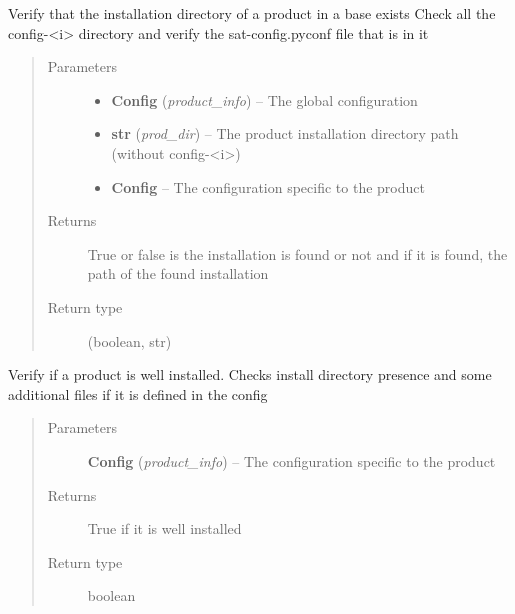 \documentclass[a4paper,10pt,english]{sphinxmanual}
\begin{document}
\begin{fulllineitems}
\label{commands/apidoc/src:src.product.check_config_exists}
Verify that the installation directory of a product in a base exists
Check all the config-\textless{}i\textgreater{} directory and verify the sat-config.pyconf file
that is in it
\begin{quote}\begin{description}
\item[{Parameters}] \leavevmode\begin{itemize}
\item {} 
\textbf{Config} (\emph{product\_info}) -- The global configuration

\item {} 
\textbf{str} (\emph{prod\_dir}) -- The product installation directory path 
(without config-\textless{}i\textgreater{})

\item {} 
\textbf{Config} -- The configuration specific to 
the product

\end{itemize}

\item[{Returns}] \leavevmode
True or false is the installation is found or not 
and if it is found, the path of the found installation

\item[{Return type}] \leavevmode
(boolean, str)

\end{description}\end{quote}

\end{fulllineitems}


\begin{fulllineitems}
\label{commands/apidoc/src:src.product.check_installation}
Verify if a product is well installed. Checks install directory presence
and some additional files if it is defined in the config
\begin{quote}\begin{description}
\item[{Parameters}] \leavevmode
\textbf{Config} (\emph{product\_info}) -- The configuration specific to 
the product

\item[{Returns}] \leavevmode
True if it is well installed

\item[{Return type}] \leavevmode
boolean

\end{description}\end{quote}

\end{fulllineitems}
\end{document}
